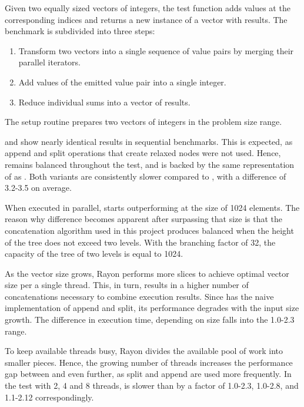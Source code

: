 Given two equally sized vectors of integers, the test function adds values at the corresponding indices and returns a new instance of a vector with results. The benchmark is subdivided into three steps:

\begin{enumerate}
    \item Transform two vectors into a single sequence of value pairs by merging their parallel iterators.
    \item Add values of the emitted value pair into a single integer.
    \item Reduce individual sums into a vector of results.
\end{enumerate}

The setup routine prepares two vectors of integers in the \range{[0, N]} problem size range.

\rbvec{} and \rrbvec{} show nearly identical results in sequential benchmarks. This is expected, as append and split operations that create relaxed nodes were not used. Hence, \rrbvec{} remains balanced throughout the test, and is backed by the same representation of \rrbtree{} as \rbvec{}. Both variants are consistently slower compared to \stdvec{}, with a difference of 3.2-3.5 on average.

When executed in parallel, \rrbvec{} starts outperforming \rbvec{} at the size of 1024 elements. The reason why difference becomes apparent after surpassing that size is that the concatenation algorithm used in this project produces balanced \rbtree{} when the height of the tree does not exceed two levels. With the branching factor of 32, the capacity of the tree of two levels is equal to 1024.

As the vector size grows, Rayon performs more slices to achieve optimal vector size per a single thread. This, in turn, results in a higher number of concatenations necessary to combine execution results. Since \rbvec{} has the naive implementation of append and split, its performance degrades with the input size growth. The difference in execution time, depending on size falls into the 1.0-2.3 range.

To keep available threads busy, Rayon divides the available pool of work into smaller pieces. Hence, the growing number of threads increases the performance gap between \rbvec{} and \rrbvec{} even further, as split and append are used more frequently. In the test with 2, 4 and 8 threads, \rbvec{} is slower than \rrbvec{} by a factor of 1.0-2.3, 1.0-2.8, and 1.1-2.12 correspondingly.

